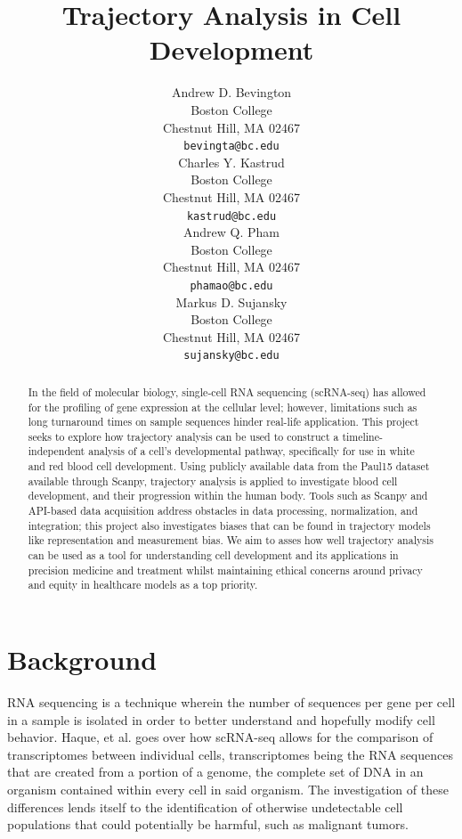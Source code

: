 \documentclass{article}
\title{Trajectory Analysis in Cell Development}
\author{%
  Andrew D. Bevington \\
  Boston College\\
  Chestnut Hill, MA 02467\\
  \texttt{bevingta@bc.edu} \\
  \And
  Charles Y. Kastrud \\
  Boston College\\
  Chestnut Hill, MA 02467\\
  \texttt{kastrud@bc.edu} \\
  \And
  Andrew Q. Pham \\
  Boston College\\
  Chestnut Hill, MA 02467\\
  \texttt{phamao@bc.edu} \\
  \And
  Markus D. Sujansky \\
  Boston College\\
  Chestnut Hill, MA 02467\\
  \texttt{sujansky@bc.edu} \\
}
\begin{document}
\maketitle


\begin{abstract}
  In the field of molecular biology, single-cell RNA sequencing (scRNA-seq) has allowed for the profiling of gene expression at the cellular level; however, limitations such as long turnaround times on sample sequences hinder real-life application. This project seeks to explore how trajectory analysis can be used to construct a timeline-independent analysis of a cell's developmental pathway, specifically for use in white and red blood cell development. Using publicly available data from the Paul15 dataset available through Scanpy, trajectory analysis is applied to investigate blood cell development, and their progression within the human body. Tools such as Scanpy and API-based data acquisition address obstacles in data processing, normalization, and integration; this project also investigates biases that can be found in trajectory models like representation and measurement bias. We aim to asses how well trajectory analysis can be used as a tool for understanding cell development and its applications in precision medicine and treatment whilst maintaining ethical concerns around privacy and equity in healthcare models as a top priority.
  
\end{abstract}


\section{Background}
RNA sequencing is a technique wherein the number of sequences per gene per cell in a sample is isolated in order to better understand and hopefully modify cell behavior. Haque, et al. goes over how scRNA-seq allows for the comparison of transcriptomes between individual cells, transcriptomes being the RNA sequences that are created from a portion of a genome, the complete set of DNA in an organism contained within every cell in said organism. The investigation of these differences lends itself to the identification of otherwise undetectable cell populations that could potentially be harmful, such as malignant tumors.
\end{document}
